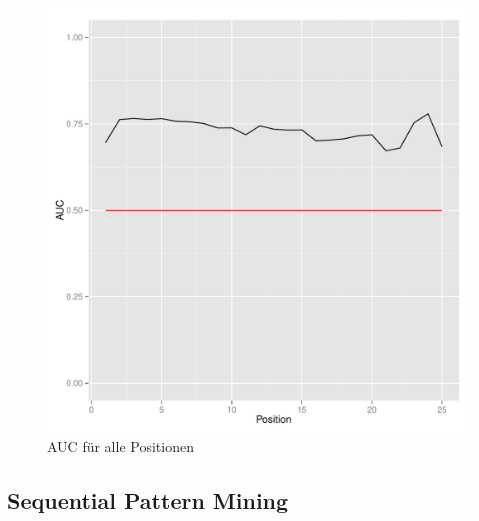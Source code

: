 \begin{figure}[H]
	\centering\includegraphics[scale=0.75]{auc.pdf}\caption[AUC-Wert]{AUC für alle Positionen}\label{auc}
\end{figure}

\subsection{Sequential Pattern Mining}\label{ergspm}

